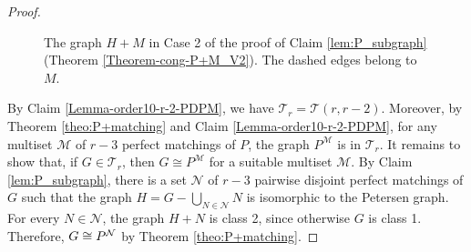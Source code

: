 \documentclass[a4paper,11pt]{article}
\newcommand{\ca}{\mathcal}
\theoremstyle{remark}
\begin{document}
\begin{proof}
\begin{figure}[htbp]
\centering
{} 
\caption{The graph $H+M$ in Case 2 of the proof of Claim \ref{lem:P_subgraph} (Theorem \ref{Theorem-cong-P+M_V2}). The dashed edges belong to $M$.}
\label{fig:H+M}
\end{figure}


By Claim \ref{Lemma-order10-r-2-PDPM},
	we have $\ca T_r = \ca T(r,r-2)$. Moreover, by Theorem \ref{theo:P+matching}
	and Claim \ref{Lemma-order10-r-2-PDPM},
	for any multiset $\ca M $ of $r-3$ perfect matchings of $ P$,  the graph $ P^{\ca M} $ is in $ \ca T_r $. It remains to show that, if
 $ G \in\ca T_r$, then $ G\cong  P^{\ca M} $ for a suitable multiset $\ca M $.
By Claim \ref{lem:P_subgraph}, there is a set $\ca N$ of $r-3$ pairwise disjoint perfect matchings of $G$ such that the graph $H=G - \bigcup_{N\in \ca N} N$ is isomorphic to the Petersen graph. For every $N \in \ca N$, the graph $H+N$ is class 2, since otherwise $G$ is class 1. Therefore,  $ G\cong P^{\cal N} $
 by Theorem \ref{theo:P+matching}.
\end{proof}
\end{document}
